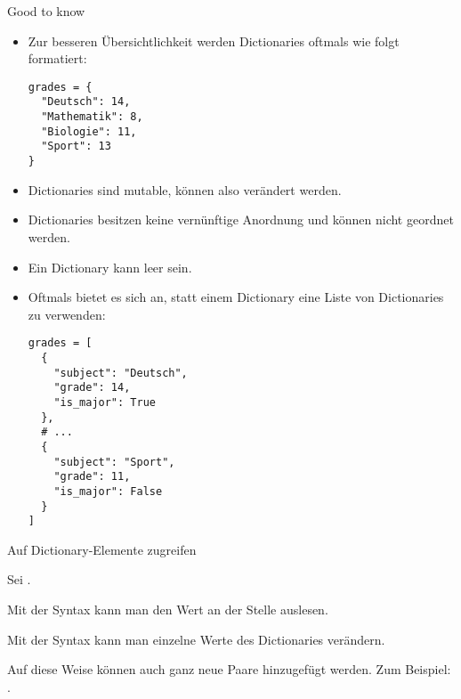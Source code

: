 \begin{fragile}

\begin{block}{Good to know}
	\pause
\begin{itemize}[<+->]
\item Zur besseren Übersichtlichkeit werden Dictionaries oftmals wie folgt formatiert: 
\begin{verbatim}
grades = { 
  "Deutsch": 14, 
  "Mathematik": 8, 
  "Biologie": 11, 
  "Sport": 13
}
\end{verbatim}
\item Dictionaries sind mutable, können also verändert werden. 
\item Dictionaries besitzen keine vernünftige Anordnung und können nicht geordnet werden. 
\item Ein Dictionary kann leer sein. 
\end{itemize}
\end{block}
\end{fragile}

\begin{fragile}
\begin{itemize}
\item Oftmals bietet es sich an, statt einem Dictionary eine Liste von Dictionaries zu verwenden:
\begin{verbatim}
grades = [
  { 
    "subject": "Deutsch", 
    "grade": 14,
    "is_major": True
  },
  # ... 
  {
    "subject": "Sport",
    "grade": 11, 
    "is_major": False
  }
]
\end{verbatim}
\end{itemize}
\end{fragile}



\begin{frame}


\begin{block}{Auf Dictionary-Elemente zugreifen}
	
	\vspace{2pt}
	
	Sei .
	
	\pause
	
	Mit der Syntax  kann man den Wert an der Stelle  auslesen. 
	
	\pause 
	
	Mit der Syntax  kann  man einzelne Werte des Dictionaries verändern. 
	
	\pause 
	
	Auf diese Weise können auch ganz neue Paare hinzugefügt werden. Zum Beispiel: . 
\end{block}
\end{frame}


